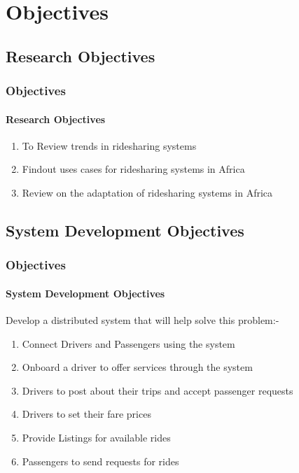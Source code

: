 \section[Objectives]{Objectives}
\subsection[Research Objectives]{Research Objectives}
\begin{frame}[allowframebreaks]
    \frametitle{Objectives}

    \framesubtitle{Research Objectives}

    \begin{enumerate}
        \item To Review trends in ridesharing systems
        \item Findout uses cases for ridesharing systems in Africa
        \item Review on the adaptation of ridesharing systems in Africa
    \end{enumerate}


\end{frame}


\subsection[System Development Objectives]{System Development Objectives}
\begin{frame}[allowframebreaks]
    \frametitle{Objectives}
    \framesubtitle{System Development Objectives}

    Develop a distributed system that will help solve this problem:-

    \begin{enumerate}
        \item Connect Drivers and Passengers using the system
        \item Onboard a driver to offer services through the system
        \item Drivers to post about their trips and accept passenger requests
        \item Drivers to set their fare prices
        \item Provide Listings for available rides
        \item Passengers to send requests for rides
    \end{enumerate}

\end{frame}